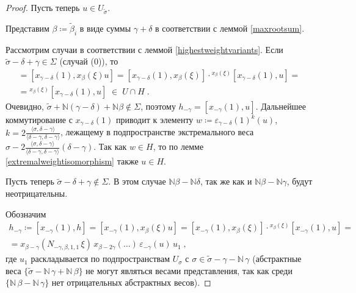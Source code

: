 \documentclass[10pt]{article}
\theoremstyle{remark}
\newcommand{\N}{\mathbb{N}}
\begin{document}
\begin{proof}
Пусть теперь $u \in  U_{\widetilde\sigma}$. 

Представим $\beta\coloneqq\widetilde\beta_i$ в виде суммы $\gamma+\delta$ в соответствии с леммой \ref{maxrootsum}.

Рассмотрим случаи в соответствии с леммой \ref{highestweightvariants}.
Если $\widetilde\sigma-\delta+\gamma \in \Sigma$ (случай (0)), то
\begin{multline*}
[x_{\gamma-\delta}(1),h] = [x_{\gamma-\delta}(1),x_\beta(\xi)u] = [x_{\gamma-\delta}(1),x_\beta(\xi)] \cdot {}^{x_\beta(\xi)}[x_{\gamma-\delta}(1),u] =\\=
{}^{x_\beta(\xi)}[x_{\gamma-\delta}(1),u] \;\in\; U\cap H \;.
\end{multline*}
Очевидно, $\widetilde\sigma + \N(\gamma-\delta)+\N\beta \notin \Sigma$, поэтому
$h_{-\gamma} = [x_{-\gamma}(1),u]$. Дальнейшее коммутирование с $x_{\gamma-\delta}(1)$ приводит к элементу $w\coloneqq\varepsilon_{\gamma-\delta}(1)^k(u)$, $k=2\frac{\langle\sigma,\delta-\gamma\rangle}{\langle\delta-\gamma,\delta-\gamma\rangle}$, лежащему в подпространстве экстремального веса $\sigma-2\frac{\langle\sigma,\delta-\gamma\rangle}{\langle\delta-\gamma,\delta-\gamma\rangle}(\delta-\gamma)$. Так как $w\in H$, то по лемме \ref{extremalweightisomorphism} также $u \in H$.

Пусть теперь $\widetilde\sigma-\delta+\gamma \notin \Sigma$. В этом случае $\N\beta-\N\delta$, так же как и $\N\beta-\N\gamma$, будут неотрицательны.

Обозначим
\begin{multline*}
h_{-\gamma} \coloneqq [x_{-\gamma}(1),h] = [x_{-\gamma}(1),x_\beta(\xi) u] = [x_{-\gamma}(1),x_\beta(\xi)] \cdot {}^{x_\beta(\xi)}[x_{-\gamma}(1),u] = \\ =
x_{\beta-\gamma}(N_{-\gamma,\beta,1,1} \,\xi) \, x_{\beta-2\gamma}(\ldots) \, \varepsilon_{-\gamma}(u) \, u_1 \; ,
\end{multline*}
где $u_1$ раскладывается по подпространствам $U_\sigma$ с $\sigma \in \widetilde\sigma-\gamma - \N \, \gamma$ (абстрактные веса $\{\widetilde\sigma-\N\,\gamma+\N\,\beta\}$ не могут являться весами представления, так как среди $\{\N\,\beta-\N\,\gamma\}$ нет отрицательных абстрактных весов).


\end{proof}
\end{document}
